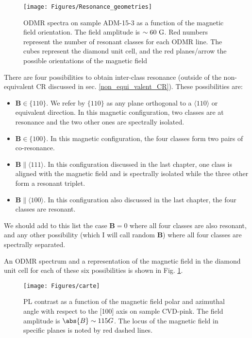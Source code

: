 \documentclass[a4paper,11pt]{report}
\begin{document}
\begin{figure}[h!]
\centering
\texttt{[image: Figures/Resonance\_geometries]}
\caption{ODMR spectra on sample ADM-15-3 as a function of the magnetic field orientation. The field amplitude is $\sim 60\ \rm G$. Red numbers represent the number of resonant classes for each ODMR line. The cubes represent the diamond unit cell, and the red planes/arrow the possible orientations of the magnetic field}
\label{ODMR_geometries}
\end{figure}

There are four possibilities to obtain inter-class resonance (outside of the non-equivalent CR discussed in sec. \ref{non_equi_valent_CR}). These possibilities are:
\begin{itemize}
\item $\mathbf{B} \in \{110\}$. We refer by $\{110\}$ as any plane orthogonal to a $\langle 110 \rangle$ or equivalent direction. In this magnetic configuration, two classes are at resonance and the two other ones are spectrally isolated.
\item $\mathbf{B} \in \{100\}$. In this magnetic configuration, the four classes form two pairs of co-resonance.
\item $\mathbf{B} \parallel \langle 111 \rangle$. In this configuration discussed in the last chapter, one class is aligned with the magnetic field and is spectrally isolated while the three other form a resonant triplet.
\item $\mathbf{B} \parallel \langle 100 \rangle$. In this configuration also discussed in the last chapter, the four classes are resonant.
\end{itemize}
We should add to this list the case $\mathbf{B}=0$ where all four classes are also resonant, and any other possibility (which I will call random $\mathbf{B}$) where all four classes are spectrally separated. 

An ODMR spectrum and a representation of the magnetic field in the diamond unit cell for each of these six possibilities is shown in Fig. \ref{ODMR_geometries}.

\begin{figure}[h]
\centering
\texttt{[image: Figures/carte]}
\caption{PL contrast as a function of the magnetic field polar and azimuthal angle with respect to the [100] axis on sample CVD-pink. The field amplitude is $\abs{B} \sim 115 G$. The locus of the magnetic field in specific planes is noted by red dashed lines.}
\label{Carte}
\end{figure}
\end{document}
